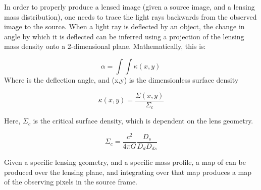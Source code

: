 
In order to properly produce a lensed image (given a source image, and a 
lensing mass distribution), one needs to trace the light rays backwards 
from the observed image to the source.  When a light ray is deflected by an 
object, the change in angle by which it is deflected \alpha can be inferred
using a projection of the lensing mass density onto a 2-dimensional plane.
Mathematically, this is: 

\begin{equation} \alpha = \int\int \kappa(x,y) \frac{}{}
\end{equation}
Where \alpha is the deflection angle, and \kappa(x,y) is the dimensionless
surface density

\begin{equation} \kappa(x,y) = \frac{\Sigma(x,y)}{\Sigma_{c}}

\end{equation}

Here, $\Sigma_{c}$ is the critical surface density, which is dependent on the
lens geometry.

\begin{equation} \Sigma_{c} = \frac{c^2}{4\pi G}\frac{D_{s}}{D_{d}D_{ds}}
\end{equation}

Given a specific lensing geometry, and a specific mass profile, a map of 
\kappa can be produced over the lensing plane, and integrating over that map
produces a map of the observing pixels in the source frame.


